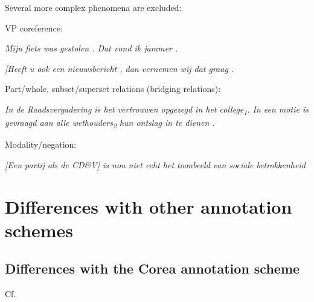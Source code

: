 Several more complex phenomena are excluded:

\begin{itemize*}
\item VP coreference:

  \emph{\n{[}Mijn fiets was gestolen\n{]} . \n{[}Dat\n{]} vond ik
  jammer .}
  
  \emph{{[}Heeft u ook een nieuwsbericht\n{]} , dan vernemen wij
  \n{[}dat\n{]} graag .}
  
\item Part/whole, subset/superset relations (bridging relations):

  \emph{In de Raadsvergadering is het vertrouwen opgezegd in \n{[}het
  college\n{]}\textsubscript{1}. In een motie is gevraagd aan \n{[}alle
  wethouders\n{]}\textsubscript{2} hun ontslag in te dienen .}
  
\item Modality/negation:

  \emph{{[}Een partij als de CD\&V{]} is nou niet echt \n{[}het toonbeeld
  van sociale betrokkenheid\n{]}}
  
\end{itemize*}


\section{Differences with other annotation schemes}
\subsection{Differences with the Corea annotation scheme}
Cf. \citet{bouma2007corea}

